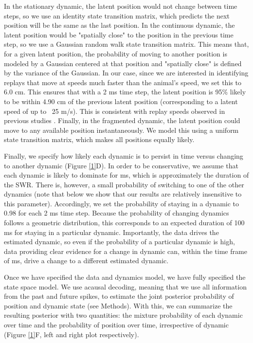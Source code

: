 \documentclass[times, twoside]{zHenriquesLab-StyleBioRxiv}
\begin{document}
In the stationary dynamic, the latent position would not change between time steps, so we use an identity state transition matrix, which predicts the next position will be the same as the last position. In the continuous dynamic, the latent position would be "spatially close" to the position in the previous time step, so we use a Gaussian random walk state transition matrix. This means that, for a given latent position, the probability of moving to another position is modeled by a Gaussian centered at that position and "spatially close" is defined by the variance of the Gaussian. In our case, since we are interested in identifying replays that move at speeds much faster than the animal's speed, we set this to 6.0 cm. This ensures that with a 2 ms time step, the latent position is 95\% likely to be within 4.90 cm of the previous latent position (corresponding to a latent speed of up to ~25 m/s). This is consistent with replay speeds observed in previous studies \cite{DavidsonHippocampalReplayExtended2009, PfeifferAutoassociativedynamicsgeneration2015}. Finally, in the fragmented dynamic, the latent position could move to any available position instantaneously. We model this using a uniform state transition matrix, which makes all positions equally likely.

Finally, we specify how likely each dynamic is to persist in time versus changing to another dynamic (Figure \ref{1}D). In order to be conservative, we assume that each dynamic is likely to dominate for  ms, which is approximately the duration of the SWR. There is, however, a small probability of switching to one of the other dynamics (note that below we show that our results are relatively insensitive to this parameter). Accordingly, we set the probability of staying in a dynamic to 0.98 for each 2 ms time step. Because the probability of changing dynamics follows a geometric distribution, this corresponds to an expected duration of 100 ms for staying in a particular dynamic. Importantly, the data drives the estimated dynamic, so even if the probability of a particular dynamic is high, data providing clear evidence for a change in dynamic can, within the time frame of  ms, drive a change to a different estimated dynamic.

Once we have specified the data and dynamics model, we have fully specified the state space model. We use acausal decoding, meaning that we use all information from the past and future spikes, to estimate the joint posterior probability of position and dynamic state (see Methods). With this, we can summarize the resulting posterior with two quantities: the mixture probability of each dynamic over time and the probability of position over time, irrespective of dynamic (Figure \ref{1}F, left and right plot respectively). 
\end{document}
